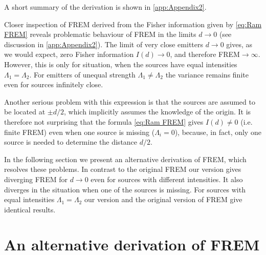 A short summary of the derivation is shown in \autoref{app:Appendix2}. 

Closer inspection of FREM derived from the Fisher information given by \autoref{eq:Ram FREM} reveals problematic behaviour of FREM in the limits $d\rightarrow 0$ (see discussion in \autoref{app:Appendix2}). The limit of very close emitters $d\rightarrow0$ gives, as we would expect, zero Fisher information $I(d)\rightarrow0$, and therefore FREM$\rightarrow\infty$. However, this is only for situation, when the sources have equal intensities $\Lambda_1=\Lambda_2$. For emitters of unequal strength $\Lambda_1\neq\Lambda_2$ the variance remains finite even for sources infinitely close. 

Another serious problem with this expression is that the sources are assumed to be located at $\pm d/2$, which implicitly assumes the knowledge of the origin. It is therefore not surprising that the formula \autoref{eq:Ram FREM} gives $I(d)\neq0$ (i.e. finite FREM) even when one source is missing ($\Lambda_i=0$), because, in fact, only one source is needed to determine the distance $d/2$. 

In the following section we present an alternative derivation of FREM, which resolves these problems. In contrast to the original FREM our version gives diverging FREM for $d\rightarrow0$ even for sources with different intensities. It also diverges in the situation when one of the sources is missing. For sources with equal intensities $\Lambda_1=\Lambda_2$ our version and the original version of FREM give identical results. 


\section{An alternative derivation of FREM\label{sub:An-alternative-derivation-FREM}} 
 
